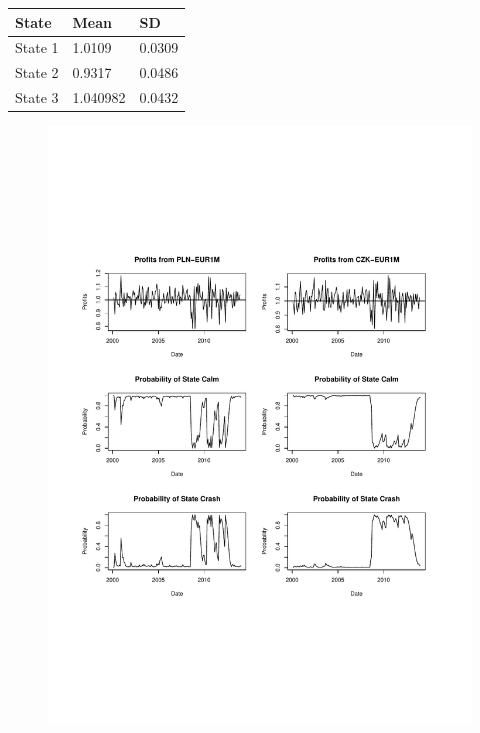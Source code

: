 \documentclass[12pt, a4paper, oneside]{article} %
\begin{document}
\begin{tabular}{l | l l}
State & Mean & SD \\
\hline
State 1 & 1.0109 & 0.0309\\
State 2 & 0.9317 & 0.0486\\
State 3 & 1.040982 & 0.0432\\
\end{tabular}

\begin{figure}[h!]
\centering
\includegraphics[scale = .80]{../Figures/2RegProb/PLNCZKEUR.pdf}
\end{figure}
\end{document}
